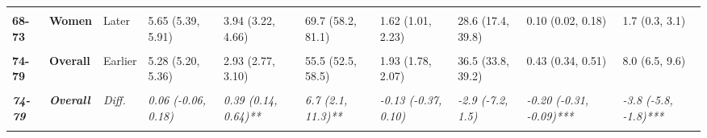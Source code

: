 \begin{table}[!h]
{{\begin{tabular}[t]{>{}l>{}lllllllll}
\cmidrule{1-10}
\textbf{\cellcolor{gray!10}{68-73}} & \textbf{\cellcolor{gray!10}{Women}} & \cellcolor{gray!10}{Earlier} & \cellcolor{gray!10}{5.62 (5.52, 5.71)} & \cellcolor{gray!10}{3.09 (2.87, 3.32)} & \cellcolor{gray!10}{55.1 (51.1, 59.1)} & \cellcolor{gray!10}{2.18 (1.95, 2.41)} & \cellcolor{gray!10}{38.8 (34.9, 42.8)} & \cellcolor{gray!10}{0.34 (0.25, 0.43)} & \cellcolor{gray!10}{6.1 (4.4, 7.7)}\\
\cmidrule{1-10}
\textbf{68-73} & \textbf{Women} & Later & 5.65 (5.39, 5.91) & 3.94 (3.22, 4.66) & 69.7 (58.2, 81.1) & 1.62 (1.01, 2.23) & 28.6 (17.4, 39.8) & 0.10 (0.02, 0.18) & 1.7 (0.3, 3.1)\\
\cmidrule{1-10}
\em{\textbf{\cellcolor{gray!10}{68-73}}} & \em{\textbf{\cellcolor{gray!10}{Women}}} & \em{\cellcolor{gray!10}{Diff.}} & \em{\cellcolor{gray!10}{0.04 (-0.24, 0.31)}} & \em{\cellcolor{gray!10}{0.85 (0.09, 1.60)*}} & \em{\cellcolor{gray!10}{14.6 (2.4, 26.7)*}} & \em{\cellcolor{gray!10}{-0.56 (-1.22, 0.09)}} & \em{\cellcolor{gray!10}{-10.2 (-22.1, 1.7)}} & \em{\cellcolor{gray!10}{-0.24 (-0.37, -0.12)***}} & \em{\cellcolor{gray!10}{-4.4 (-6.5, -2.2)***}}\\
\cmidrule{1-10}
\textbf{74-79} & \textbf{Overall} & Earlier & 5.28 (5.20, 5.36) & 2.93 (2.77, 3.10) & 55.5 (52.5, 58.5) & 1.93 (1.78, 2.07) & 36.5 (33.8, 39.2) & 0.43 (0.34, 0.51) & 8.0 (6.5, 9.6)\\
\cmidrule{1-10}
\textbf{\cellcolor{gray!10}{74-79}} & \textbf{\cellcolor{gray!10}{Overall}} & \cellcolor{gray!10}{Later} & \cellcolor{gray!10}{5.34 (5.25, 5.43)} & \cellcolor{gray!10}{3.32 (3.13, 3.51)} & \cellcolor{gray!10}{62.2 (58.7, 65.7)} & \cellcolor{gray!10}{1.79 (1.61, 1.98)} & \cellcolor{gray!10}{33.6 (30.2, 37.0)} & \cellcolor{gray!10}{0.23 (0.16, 0.29)} & \cellcolor{gray!10}{4.2 (3.0, 5.5)}\\
\cmidrule{1-10}
\em{\textbf{74-79}} & \em{\textbf{Overall}} & \em{Diff.} & \em{0.06 (-0.06, 0.18)} & \em{0.39 (0.14, 0.64)**} & \em{6.7 (2.1, 11.3)**} & \em{-0.13 (-0.37, 0.10)} & \em{-2.9 (-7.2, 1.5)} & \em{-0.20 (-0.31, -0.09)***} & \em{-3.8 (-5.8, -1.8)***}\\
\cmidrule{1-10}
\textbf{\cellcolor{gray!10}{74-79}} & \textbf{\cellcolor{gray!10}{Men}} & \cellcolor{gray!10}{Earlier} & \cellcolor{gray!10}{5.22 (5.11, 5.33)} & \cellcolor{gray!10}{3.03 (2.83, 3.23)} & \cellcolor{gray!10}{58.0 (54.4, 61.7)} & \cellcolor{gray!10}{1.89 (1.71, 2.07)} & \cellcolor{gray!10}{36.2 (32.8, 39.5)} & \cellcolor{gray!10}{0.30 (0.22, 0.39)} & \cellcolor{gray!10}{5.8 (4.1, 7.4)}\\

\end{tabular}}}
\end{table}
